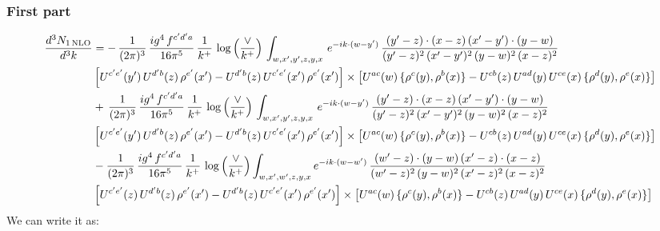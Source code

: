 \documentclass[9pt]{article}
\numberwithin{equation}{section}
\begin{document}
 \subsubsection{First part}
\begin{align}
     \frac{d^{3}N_{1\,\rm NLO}}{d^{3}k} & =   -\,\frac{1}{(2\pi)^{3}}\, \frac{ig^{4}\,f^{c'd'a}}{16\pi^{5}}\, \frac{1}{k^{+}}\,\log{\left(\frac{\vee}{k^{+}}\right)}\, \int_{w,x',y',z,y,x}\, e^{-ik\cdot (w-y')}\,\frac{(y'-z)\cdot (x-z)\,(x'-y')\cdot (y-w)}{(y'-z)^{2}\,(x'-y')^{2}\,(y-w)^{2}\,(x-z)^{2}}\notag \\ &  \left[U^{c'e'}(y')\,U^{d'b}(z)\,\rho^{e'}(x')-U^{d'b}(z)\,U^{c'e'}(x')\,\rho^{e'}(x')\right]\times  \left[U^{ac}(w)\, \{\rho^{c}(y),\rho^{b}(x)\}-U^{cb}(z)\,U^{ad}(y)\,U^{ce}(x)\,\{\rho^{d}(y),\rho^{e}(x)\}\right] \notag \\
&   +\,\frac{1}{(2\pi)^{3}}\, \frac{ig^{4}\,f^{c'd'a}}{16\pi^{5}}\, \frac{1}{k^{+}}\,\log{\left(\frac{\vee}{k^{+}}\right)}\, \int_{w,x',y',z,y,x}\, e^{-ik\cdot (w-y')}\,\frac{(y'-z)\cdot (x-z)\,(x'-y')\cdot (y-w)}{(y'-z)^{2}\,(x'-y')^{2}\,(y-w)^{2}\,(x-z)^{2}}\notag \\ &    \left[U^{c'e'}(y')\,U^{d'b}(z)\,\rho^{e'}(x')-U^{d'b}(z)\,U^{c'e'}(x')\,\rho^{e'}(x')\right]\times  \left[U^{ac}(w)\, \{\rho^{c}(y),\rho^{b}(x)\}-U^{cb}(z)\,U^{ad}(y)\,U^{ce}(x)\,\{\rho^{d}(y),\rho^{e}(x)\}\right] \notag \\
&   -\frac{1}{(2\pi)^{3}}\, \frac{ig^{4}\,f^{c'd'a}}{16\pi^{5}}\, \frac{1}{k^{+}}\,\log{\left(\frac{\vee}{k^{+}}\right)}\int_{w,x',w',z,y,x} e^{-ik\cdot (w-w')}\,\frac{(w'-z)\cdot (y-w)\,(x'-z)\cdot (x-z)}{(w'-z)^{2}\,(y-w)^{2}\,(x'-z)^{2}\,(x-z)^{2}}\notag \\
&   \left[U^{c'e'}(z)\,U^{d'b}(z)\,\rho^{e'}(x')-U^{d'b}(z)\,U^{c'e'}(x')\,\rho^{e'}(x')\right]  \times\left[U^{ac}(w)\, \{\rho^{c}(y),\rho^{b}(x)\}-U^{cb}(z)\,U^{ad}(y)\,U^{ce}(x)\,\{\rho^{d}(y),\rho^{e}(x)\}\right]
\end{align}
We can write it as: 
\end{document}
